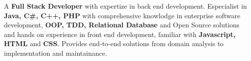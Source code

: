 \nohyphens{\justify
A \textbf{Full Stack Developer} with expertize in back end development. Especialist in \textbf{Java, C#, C++, PHP}
with comprehensive knowlodge in
enterprise software development, \textbf{OOP, TDD, Relational Database} and Open Source solutions and hands on experience in front end development,
familiar with \textbf{Javascript, HTML} and \textbf{CSS}. Provides end-to-end solutions from domain analysis to implementation and maintainance.
}
